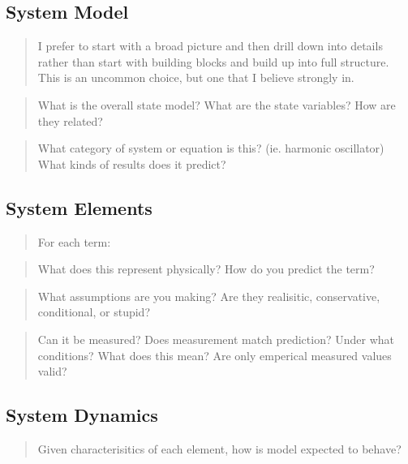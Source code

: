 \documentclass[
  10pt,
  draftcls,
  technote,
  letterpaper,
  oneside,
  onecolumn]{IEEEtran}
\begin{document}
\hypertarget{system-model}{%
\subsection{System Model}\label{system-model}}

\begin{quote}
I prefer to start with a broad picture and then drill down into details
rather than start with building blocks and build up into full structure.
This is an uncommon choice, but one that I believe strongly in.
\end{quote}

\begin{quote}
What is the overall state model? What are the state variables? How are
they related?
\end{quote}

\begin{quote}
What category of system or equation is this? (ie. harmonic oscillator)
What kinds of results does it predict?
\end{quote}

\hypertarget{system-elements}{%
\subsection{System Elements}\label{system-elements}}

\begin{quote}
For each term:
\end{quote}

\begin{quote}
What does this represent physically? How do you predict the term?
\end{quote}

\begin{quote}
What assumptions are you making? Are they realisitic, conservative,
conditional, or stupid?
\end{quote}

\begin{quote}
Can it be measured? Does measurement match prediction? Under what
conditions? What does this mean? Are only emperical measured values
valid?
\end{quote}

\hypertarget{system-dynamics}{%
\subsection{System Dynamics}\label{system-dynamics}}

\begin{quote}
Given characterisitics of each element, how is model expected to behave?
\end{quote}
\end{document}
